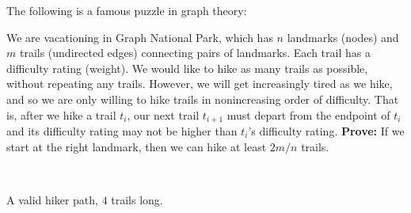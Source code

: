 \documentclass{theoretics}
\begin{document}
The following is a famous puzzle in graph theory:

\begin{puzzle}\label{puzzle:hiker}
  We are vacationing in Graph National Park, which has $n$ landmarks (nodes) and $m$ trails (undirected edges) connecting pairs of landmarks.
Each trail has a difficulty rating (weight).
We would like to hike as many trails as possible, without repeating any trails.
However, we will get increasingly tired as we hike, and so we are only willing to hike trails in nonincreasing order of difficulty.
That is, after we hike a trail $t_i$, our next trail $t_{i+1}$ must depart from the endpoint of $t_i$ and its difficulty rating may not be higher than $t_i$'s difficulty rating.
\textbf{Prove:} If we start at the right landmark, then we can hike at least $2m/n$ trails.

\begin{center}

~

A valid hiker path, $4$ trails long.
\end{center}
\end{puzzle}

\end{document}
